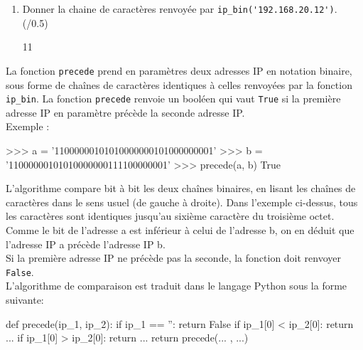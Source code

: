 \documentclass[a4paper,10pt]{report}
\begin{document}
    \medskip

    \begin{enumerate}[resume]
        \item Donner la chaine de caractères renvoyée par \verb|ip_bin('192.168.20.12')|. (/0.5)
        
                \begin{answer}{1}{1}    \end{answer}

    \end{enumerate}

    \medskip

    La fonction \verb|precede| prend en paramètres deux adresses IP en notation binaire, sous forme de chaînes de caractères identiques à celles renvoyées par la fonction \verb|ip_bin|. La fonction \verb|precede| renvoie un booléen qui vaut \verb|True| si la première adresse IP en paramètre précède la seconde adresse IP.\\

Exemple :

\begin{CodePythontexAlt}[TaillePolice=\large, Largeur=1\linewidth,Centre,Lignes=true,PremLigne=1]{}

>>> a = '11000000101010000000101000000001' 
>>> b = '11000000101010000000111100000001' 
>>> precede(a, b) 
True
	\end{CodePythontexAlt}

    L'algorithme compare bit à bit les deux chaînes binaires, en lisant les chaînes de caractères dans le sens usuel (de gauche à droite). Dans l'exemple ci-dessus, tous les caractères sont identiques jusqu'au sixième caractère du troisième octet. Comme le bit de l'adresse a est inférieur à celui de l'adresse b, on en déduit que l'adresse IP a précède l'adresse IP b.\\

Si la première adresse IP ne précède pas la seconde, la fonction doit renvoyer \verb|False|.\\

L’algorithme de comparaison est traduit dans le langage Python sous la forme suivante:\\

\begin{CodePythontexAlt}[TaillePolice=\large, Largeur=1\linewidth,Centre,Lignes=true,PremLigne=1]{}

def precede(ip_1, ip_2):
    if ip_1 == '':
        return False
    if ip_1[0] < ip_2[0]:
        return ...
    if ip_1[0] > ip_2[0]:
        return ...
    return precede(... , ...)

	\end{CodePythontexAlt}
\end{document}

